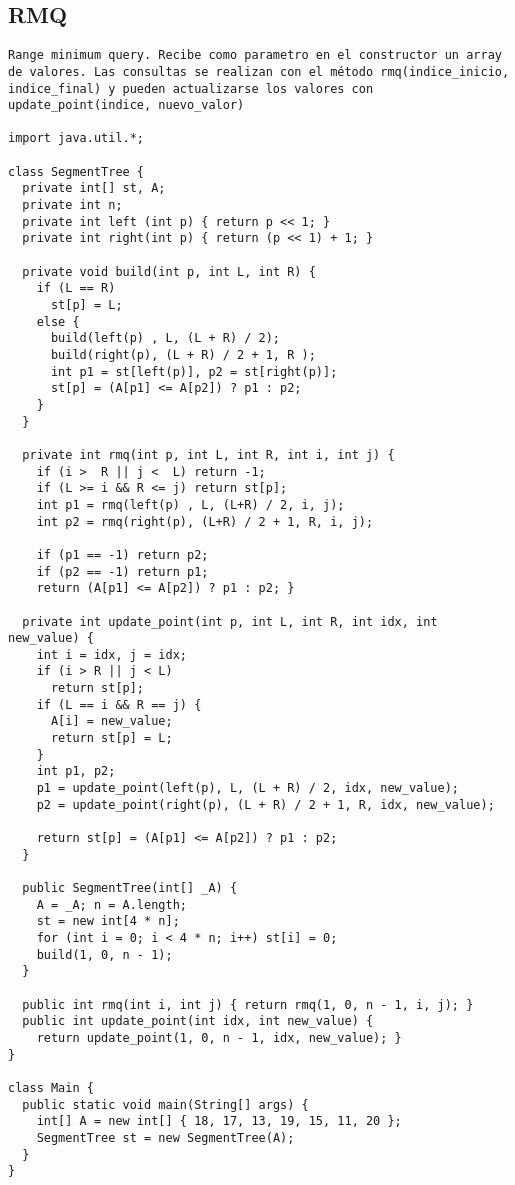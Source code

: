 \documentclass[10pt,letterpaper,twocolumn,twosided]{article}
\begin{document}
\subsection{RMQ}
\begin{lstlisting}
Range minimum query. Recibe como parametro en el constructor un array de valores. Las consultas se realizan con el método rmq(indice_inicio, indice_final) y pueden actualizarse los valores con update_point(indice, nuevo_valor)

import java.util.*;

class SegmentTree {        
  private int[] st, A;
  private int n;
  private int left (int p) { return p << 1; }
  private int right(int p) { return (p << 1) + 1; }

  private void build(int p, int L, int R) {
    if (L == R) 
      st[p] = L;
    else { 
      build(left(p) , L, (L + R) / 2);
      build(right(p), (L + R) / 2 + 1, R );
      int p1 = st[left(p)], p2 = st[right(p)];
      st[p] = (A[p1] <= A[p2]) ? p1 : p2;
    } 
  }

  private int rmq(int p, int L, int R, int i, int j) {
    if (i >  R || j <  L) return -1;
    if (L >= i && R <= j) return st[p];
    int p1 = rmq(left(p) , L, (L+R) / 2, i, j);
    int p2 = rmq(right(p), (L+R) / 2 + 1, R, i, j);

    if (p1 == -1) return p2;  
    if (p2 == -1) return p1;
    return (A[p1] <= A[p2]) ? p1 : p2; } 

  private int update_point(int p, int L, int R, int idx, int new_value) {
    int i = idx, j = idx;
    if (i > R || j < L)
      return st[p];
    if (L == i && R == j) {
      A[i] = new_value; 
      return st[p] = L; 
    }
    int p1, p2;
    p1 = update_point(left(p), L, (L + R) / 2, idx, new_value);
    p2 = update_point(right(p), (L + R) / 2 + 1, R, idx, new_value);

    return st[p] = (A[p1] <= A[p2]) ? p1 : p2;
  }

  public SegmentTree(int[] _A) {
    A = _A; n = A.length; 
    st = new int[4 * n];
    for (int i = 0; i < 4 * n; i++) st[i] = 0;
    build(1, 0, n - 1); 
  }

  public int rmq(int i, int j) { return rmq(1, 0, n - 1, i, j); } 
  public int update_point(int idx, int new_value) {
    return update_point(1, 0, n - 1, idx, new_value); }
}

class Main {
  public static void main(String[] args) {
    int[] A = new int[] { 18, 17, 13, 19, 15, 11, 20 };
    SegmentTree st = new SegmentTree(A);
  }
}
\end{lstlisting}
\end{document}
